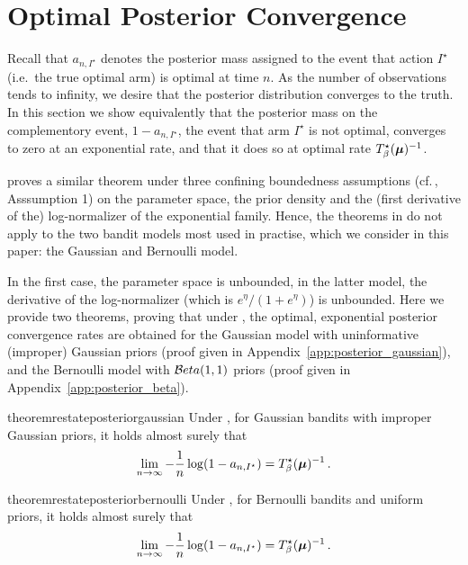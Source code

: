 \section{Optimal Posterior Convergence
}\label{sec:bayesian}

Recall that $a_{n, I^\star}$ denotes the posterior mass assigned to the event that action $I^\star$ (i.e.\ the true optimal arm) is optimal at time $n$. As the number of observations tends to infinity, we desire that the posterior distribution converges to the truth. In this section we show equivalently that the posterior mass on the complementory event, $1 - a_{n, I^\star}$, the event that arm $I^\star$ is not optimal, converges to zero at an exponential rate, and that it does so at optimal rate $T_{\beta}^\star({\boldsymbol \mu})^{-1}$. 

\citet{russo2016ttts} proves a similar theorem under three confining boundedness assumptions (cf.\,\citealt{russo2016ttts}, Asssumption 1) on the parameter space, the prior density and the (first derivative of the) log-normalizer of the exponential family. Hence, the theorems in \cite{russo2016ttts} do not apply to the two bandit models most used in practise, which we consider in this paper: the Gaussian and Bernoulli model. 

In the first case, the parameter space is unbounded, in the latter model, the derivative of the log-normalizer (which is $e^{\eta} / (1 + e^\eta)$) is unbounded. Here we provide two theorems, proving that under \TTTS, the optimal, exponential posterior convergence rates are obtained for the Gaussian model with uninformative (improper) Gaussian priors (proof given in Appendix~\ref{app:posterior_gaussian}), and the Bernoulli model with $\mathcal{B} eta(1,1)$ priors (proof given in Appendix~\ref{app:posterior_beta}).

\begin{restatable}{theorem}{restateposteriorgaussian}\label{thm:posterior_gaussian}
    Under \TTTS, for Gaussian bandits with improper Gaussian priors, it holds almost surely that 
    \[
        \lim_{n\rightarrow{\infty}} -\frac{1}{n}\log(1-a_{n,I^\star}) = T_{\beta}^\star({\boldsymbol \mu})^{-1}\,.
    \]
\end{restatable}

\begin{restatable}{theorem}{restateposteriorbernoulli}\label{thm:posterior_bernoulli}
	Under \TTTS, for Bernoulli bandits and uniform priors, it holds almost surely that
	\[
	\lim_{n\rightarrow{\infty}} -\frac{1}{n}\log(1-a_{n,I^\star}) = T_{\beta}^\star({\boldsymbol \mu})^{-1}\,.
	\]
\end{restatable}
